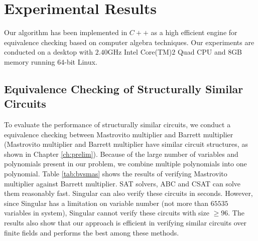 \section{Experimental Results}
Our algorithm has been implemented in $C++$ as a high efficient engine for equivalence checking based on computer 
algebra techniques. Our experiments are conducted on a desktop with $2.40$GHz Intel
Core(TM)$2$ Quad CPU and  $8$GB memory running $64$-bit Linux. 

\subsection{Equivalence Checking of Structurally Similar Circuits}
To evaluate the performance of structurally similar circuits, we conduct a equivalence checking
between Mastrovito multiplier and Barrett multiplier (Mastrovito multiplier and Barrett multiplier have similar circuit structures, 
as shown in Chapter \ref{ch:prelim}). Because of the large number of variables and polynomials present in our problem, 
we combine multiple polynomials into one polynomial.
Table \ref{tab:bvsmas} shows the results of verifying Mastrovito multiplier against Barrett multiplier. 
SAT solvers, ABC and CSAT can solve them reasonably fast. Singular can also verify these circuits in seconds.
However, since Singular has a limitation on variable number (not more than $65535$ variables in system),
Singular cannot verify these circuits with size $\ge 96$.
The results also show that our approach is efficient in verifying similar circuits over finite fields and performs
the best among these methods. 

